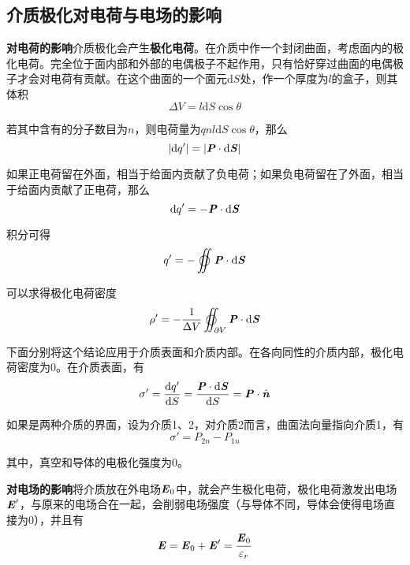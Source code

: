 \documentclass[UTF8,openany]{book}
\begin{document}
	\subsection{介质极化对电荷与电场的影响}
	\par \textbf{对电荷的影响}\quad 介质极化会产生\textbf{极化电荷}。在介质中作一个封闭曲面，考虑面内的极化电荷。完全位于面内部和外部的电偶极子不起作用，只有恰好穿过曲面的电偶极子才会对电荷有贡献。在这个曲面的一个面元$\mathrm{d}S$处，作一个厚度为$l$的盒子，则其体积
	$$\Delta V=l\mathrm{d}S\cos\theta$$
	\par 若其中含有的分子数目为$n$，则电荷量为$qnl\mathrm{d}S\cos\theta$，那么
	$$|\mathrm{d}q'|=|\textbf{\textit{P}}\cdot\mathrm{d}\textbf{\textit{S}}|$$
	\par 如果正电荷留在外面，相当于给面内贡献了负电荷；如果负电荷留在了外面，相当于给面内贡献了正电荷，那么
	$$\mathrm{d}q'=-\textbf{\textit{P}}\cdot\mathrm{d}\textbf{\textit{S}}$$
	\par 积分可得
	$$q'=-\varoiint\textbf{\textit{P}}\cdot\mathrm{d}\textbf{\textit{S}}$$
	\par 可以求得极化电荷密度
	$$\rho'=-\frac{1}{\Delta V}\varoiint_{\partial V}\textbf{\textit{P}}\cdot\mathrm{d}\textbf{\textit{S}}$$
	\par 下面分别将这个结论应用于介质表面和介质内部。在各向同性的介质内部，极化电荷密度为0。在介质表面，有
	$$\sigma'=\frac{\mathrm{d}q'}{\mathrm{d}S}=\frac{\textbf{\textit{P}}\cdot\mathrm{d}\textbf{\textit{S}}}{\mathrm{d}S}=\textbf{\textit{P}}\cdot\hat{\textbf{\textit{n}}}$$
	\par 如果是两种介质的界面，设为介质1、2，对介质2而言，曲面法向量指向介质1，有
	$$\sigma'=P_{2n}-P_{1n}$$
	\par 其中，真空和导体的电极化强度为0。
	\par \textbf{对电场的影响}\quad 将介质放在外电场$\textbf{\textit{E}}_0$中，就会产生极化电荷，极化电荷激发出电场$\textbf{\textit{E}}'$，与原来的电场合在一起，会削弱电场强度（与导体不同，导体会使得电场直接为0），并且有
	$$\textbf{\textit{E}}=\textbf{\textit{E}}_0+\textbf{\textit{E}}'=\frac{\textbf{\textit{E}}_0}{\varepsilon_{r}}$$
\end{document}
